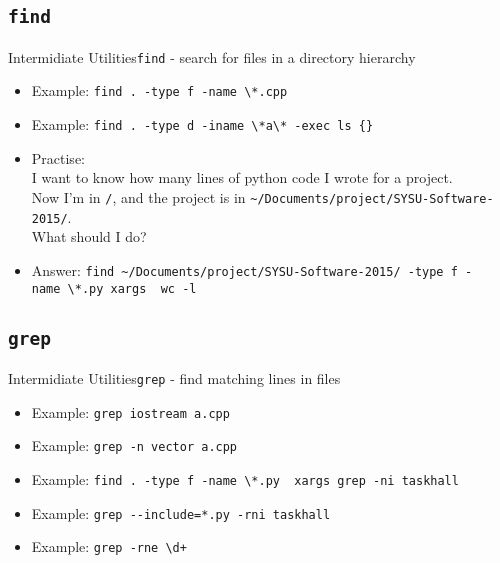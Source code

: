 \documentclass[aspectratio=169]{beamer}
\begin{document}
\subsection{\tt find}
\begin{frame}{Intermidiate Utilities}{\texttt{find} - search for files in a directory hierarchy}

\begin{itemize}[<+->]
\item
  Example: \texttt{find\ .\ -type\ f\ -name\ \textbackslash{}*.cpp}
\item
  Example:
  \texttt{find\ .\ -type\ d\ -iname\ \textbackslash{}*a\textbackslash{}*\ -exec\ ls\ \{\}}
\item
  Practise:\\
  I want to know how many lines of python code I wrote for a project.\\
  Now I'm in \texttt{/}, and the project is in
  \texttt{\textasciitilde{}/Documents/project/SYSU-Software-2015/}.\\
  What should I do?
\item
  Answer:
  \texttt{find\ \textasciitilde{}/Documents/project/SYSU-Software-2015/\ -type\ f\ -name\ \textbackslash{}*.py\ \textbar{}xargs\ \ wc\ -l}
\end{itemize}

\end{frame}

\subsection{\tt grep}
\begin{frame}{Intermidiate Utilities}{\texttt{grep} - find matching lines in files}

\begin{itemize}[<+->]
\item
  Example: \texttt{grep\ iostream\ a.cpp}
\item
  Example: \texttt{grep\ -n\ vector\ a.cpp}
\item
  Example:
  \texttt{find\ .\ -type\ f\ -name\ \textbackslash{}*.py\ \textbar{}\ xargs\ grep\ -ni\ taskhall}
\item
  Example: \texttt{grep\ -\/-include=*.py\ -rni\ taskhall}
\item
  Example:
  \texttt{grep\ -rne\ \textquotesingle{}\textbackslash{}d+\textquotesingle{}}
\end{itemize}

\end{frame}
\end{document}

